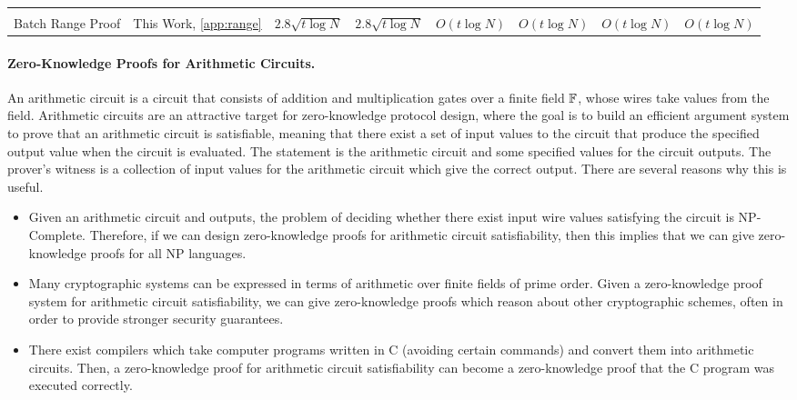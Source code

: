 {\begin{landscape}
\begin{tabular}{| l | c | c | c | c | c | c | c |}
\hline
&&&&&&&\\[-1em]
Batch Range Proof &This Work, \ref{app:range} & $2.8\sqrt{t\log N}$ & $2.8\sqrt{t\log N}$ & $O(t \log N)$ & $O(t \log N)$ & $O(t \log N)$ & $O(t\log N)$\\
\hline
\end{tabular}
\label{taEfficiency9}
\end{landscape}
\clearpage
}

\paragraph{Zero-Knowledge Proofs for Arithmetic Circuits.} An arithmetic circuit is a circuit that consists of addition and multiplication gates over a finite field $\mathbb{F}$, whose wires take values from the field. Arithmetic circuits are an attractive target for zero-knowledge protocol design, where the goal is to build an efficient argument system to prove that an arithmetic circuit is satisfiable, meaning that there exist a set of input values to the circuit that produce the specified output value when the circuit is evaluated. The statement is the arithmetic circuit and some specified values for the circuit outputs. The prover's witness is a collection of input values for the arithmetic circuit which give the correct output. There are several reasons why this is useful.
\begin{itemize}
\item Given an arithmetic circuit and outputs, the problem of deciding whether there exist input wire values satisfying the circuit is NP-Complete. Therefore, if we can design zero-knowledge proofs for arithmetic circuit satisfiability, then this implies that we can give zero-knowledge proofs for all NP languages.
\item Many cryptographic systems can be expressed in terms of arithmetic over finite fields of prime order. Given a zero-knowledge proof system for arithmetic circuit satisfiability, we can give zero-knowledge proofs which reason about other cryptographic schemes, often in order to provide stronger security guarantees.
\item There exist compilers which take computer programs written in C \cite{PHGR13,WahbySRBW15} (avoiding certain commands) and convert them into arithmetic circuits. Then, a zero-knowledge proof for arithmetic circuit satisfiability can become a zero-knowledge proof that the C program was executed correctly.
\end{itemize}

